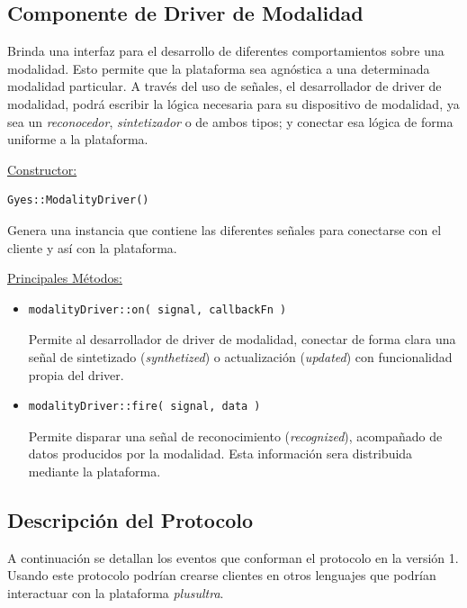 \subsection{Componente de Driver de Modalidad}

Brinda una interfaz para el desarrollo de diferentes comportamientos sobre una modalidad. Esto permite que la plataforma sea agnóstica a una determinada modalidad particular. A través del uso de señales, el desarrollador de driver de modalidad, podrá escribir la lógica necesaria para su dispositivo de modalidad, ya sea un \emph{reconocedor}, \emph{sintetizador} o de ambos tipos; y conectar esa lógica de forma uniforme a la plataforma.


\underline{\textsf{Constructor:}}
\begin{lstlisting}
Gyes::ModalityDriver()
\end{lstlisting}
Genera una instancia que contiene las diferentes señales para conectarse con el cliente y así con la plataforma.


\underline{\textsf{Principales Métodos:}}
\begin{itemize}
\item[]
\begin{lstlisting}
modalityDriver::on( signal, callbackFn )
\end{lstlisting}
Permite al desarrollador de driver de modalidad, conectar de forma clara una señal de sintetizado (\emph{synthetized}) o actualización (\emph{updated}) con funcionalidad propia del driver.
\item[]
\begin{lstlisting}
modalityDriver::fire( signal, data )
\end{lstlisting}
Permite disparar una señal de reconocimiento (\emph{recognized}), acompañado de datos producidos por la modalidad. Esta información sera distribuida mediante la plataforma.
\end{itemize}


\subsection{Descripción del Protocolo}
A continuación se detallan los eventos que conforman el protocolo en la versión 1. Usando este protocolo podrían crearse clientes en otros lenguajes que podrían interactuar con la plataforma \emph{plusultra}.

